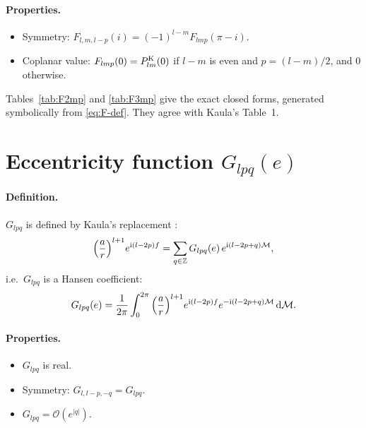 \paragraph{Properties.}
\begin{itemize}
  \item Symmetry: $F_{l,m,l-p}(i)=(-1)^{l-m}F_{lmp}(\pi-i)$.
  \item Coplanar value: $F_{lmp}(0)=P^{\mathrm K}_{lm}(0)$ if $l-m$ is even and $p=(l-m)/2$, and $0$ otherwise.
\end{itemize}
Tables~\ref{tab:F2mp} and \ref{tab:F3mp} give the exact closed forms, generated symbolically from \eqref{eq:F-def}. They agree with Kaula's Table~1.



\section{Eccentricity function $G_{lpq}(e)$}
\paragraph{Definition.} $G_{lpq}$ is defined by Kaula's replacement \citep[p.~35]{Kaula2000}:
\begin{equation}
  \Big(\frac ar\Big)^{l+1}e^{\mathrm{i}(l-2p)f}=\sum_{q\in\mathbb Z}G_{lpq}(e)\,e^{\mathrm{i}(l-2p+q)\mathcal{M}}, \label{eq:G-def}
\end{equation}
i.e.\ $G_{lpq}$ is a Hansen coefficient:
\[
  G_{lpq}(e)=\frac1{2\pi}\int_0^{2\pi}\Big(\frac ar\Big)^{l+1}e^{\mathrm{i}(l-2p)f}e^{-\mathrm{i}(l-2p+q)\mathcal{M}}\,\mathrm{d}\mathcal{M}.
\]

\paragraph{Properties.}
\begin{itemize}
  \item $G_{lpq}$ is real.
  \item Symmetry: $G_{l,l-p,-q}=G_{lpq}$.
  \item $G_{lpq}=\mathcal O(e^{|q|})$.
\end{itemize}

